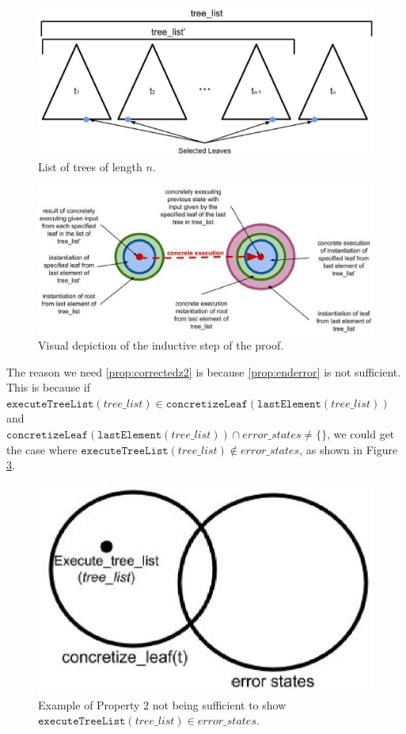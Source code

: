 \begin{figure}
\centering
\includegraphics[width=.8\textwidth]{tlist.eps}
\caption{List of trees of length $n$.}
\label{fig:tlist}
\end{figure}

\begin{figure}
\centering
\includegraphics[width=.8\textwidth]{set4.eps}
\caption{Visual depiction of the inductive step of the proof.}
\label{fig:indstep}
\end{figure}




The reason we need \ref{prop:correctedz2} is because \ref{prop:enderror} is not sufficient. 
This is because if $\mathtt{executeTreeList} (tree\_list) \in \mathtt{concretizeLeaf} (\mathtt{lastElement}(tree\_list))$ and \\
$\mathtt{concretizeLeaf} (\mathtt{lastElement} (tree\_list)) \cap error\_states \neq \{\}$, we could get the case where
$\mathtt{executeTreeList} (tree\_list) \notin error\_states$, as shown in Figure \ref{fig:Prop2}.

\begin{figure}
  \centering
\includegraphics[width=.4\textwidth]{prop2.eps}
\caption{Example of Property $2$ not being sufficient to show $\mathtt{executeTreeList} (tree\_list) \in error\_states$.}
\label{fig:Prop2}
\end{figure}

